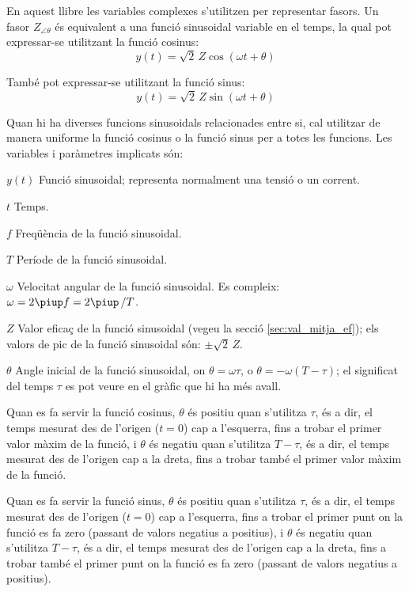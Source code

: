 \pagebreak

En aquest llibre les variables complexes s'utilitzen per representar fasors. Un fasor $Z_{\angle \theta}$ és equivalent a una funció sinusoidal variable en el temps, la qual pot expressar-se utilitzant la funció cosinus:
\[y(t)=\sqrt{2}\, Z \cos(\omega t + \theta)\]

També pot expressar-se utilitzant la funció sinus:
\[y(t)=\sqrt{2}\, Z \sin(\omega t + \theta)\]

Quan hi ha diverses funcions sinusoidals relacionades entre si, cal utilitzar de manera uniforme la funció cosinus o la funció sinus per a totes les funcions. Les variables i paràmetres implicats són:
\begin{list}{}
{\setlength{\labelwidth}{15mm} \setlength{\leftmargin}{20mm}
\setlength{\labelsep}{5mm}}
    \item[$y(t)$] Funció sinusoidal; representa normalment una tensió o un corrent.
    \item[$t$] Temps.
    \item[$f$] Freqüència de la funció sinusoidal.
    \item[$T$] Període de la funció sinusoidal.
    \item[$\omega$] Velocitat angular de la funció sinusoidal. Es compleix: $\omega = 2 \piup f = 2 \piup\,/T$.
    \item[$Z$] Valor eficaç de la funció sinusoidal (vegeu la secció \vref{sec:val_mitja_ef}); els valors de pic de la funció sinusoidal  són:  $\pm\sqrt{2}\, Z$.
    \item[$\theta$] Angle inicial de la funció sinusoidal, on  $\theta=\omega \tau$, o $\theta=-\omega (T-\tau)$; el significat del temps $\tau$  es pot veure en el gràfic que hi ha més avall.

    Quan es fa servir la funció cosinus, $\theta$ és positiu quan s'utilitza $\tau$, és a dir, el temps mesurat  des de l'origen ($t=0$) cap a l'esquerra, fins a trobar el primer valor màxim de la funció, i $\theta$ és negatiu quan s'utilitza $T-\tau$, és a dir, el temps mesurat des de l'origen cap a la dreta, fins a trobar també el primer valor màxim de la funció.

    Quan es fa servir la funció sinus, $\theta$ és positiu quan s'utilitza $\tau$, és a dir, el temps mesurat des de l'origen ($t=0$) cap a l'esquerra, fins a trobar el primer punt on la funció es fa zero (passant de valors negatius a positius), i $\theta$ és negatiu quan s'utilitza $T-\tau$, és a dir, el temps mesurat des de l'origen cap a la dreta, fins a trobar també el primer punt on la funció es fa zero (passant de valors negatius a positius).
    \item[] 
\end{list}

